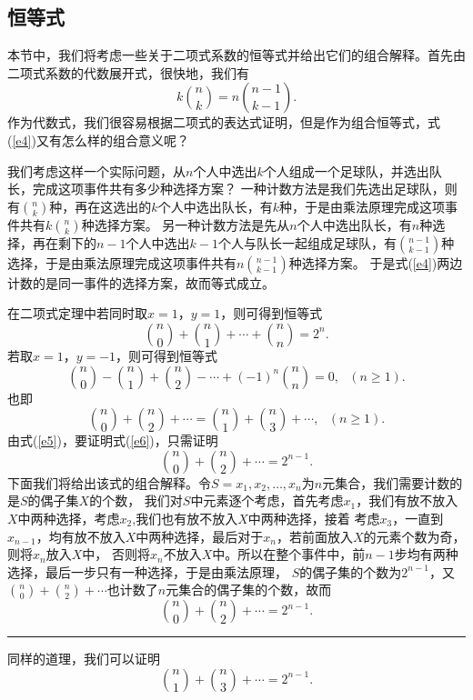 \documentclass[a4paper,11pt,twoside]{book}
\def\qed{\nopagebreak\hfill{\rule{4pt}{7pt}}\medbreak}
\begin{document}
\subsection{恒等式}
本节中，我们将考虑一些关于二项式系数的恒等式并给出它们的组合解释。首先由二项式系数的代数展开式，很快地，我们有
\begin{equation}\label{e4}
k{n\choose k}=n{n-1 \choose k-1}.
\end{equation}
作为代数式，我们很容易根据二项式的表达式证明，但是作为组合恒等式，式(\ref{e4})又有怎么样的组合意义呢？

我们考虑这样一个实际问题，从$n$个人中选出$k$个人组成一个足球队，并选出队长，完成这项事件共有多少种选择方案？
一种计数方法是我们先选出足球队，则有${n\choose
k}$种，再在这选出的$k$个人中选出队长，有$k$种，于是由乘法原理完成这项事件共有$k{n\choose
k}$种选择方案。
另一种计数方法是先从$n$个人中选出队长，有$n$种选择，再在剩下的$n-1$个人中选出$k-1$个人与队长一起组成足球队，有${n-1\choose
k-1}$种选择，于是由乘法原理完成这项事件共有$n{n-1 \choose
k-1}$种选择方案。
于是式(\ref{e4})两边计数的是同一事件的选择方案，故而等式成立。

在二项式定理中若同时取$x=1$，$y=1$，则可得到恒等式
\begin{equation}\label{e5}
{n\choose 0}+{n\choose 1}+\cdots+{n\choose n}=2^n.
\end{equation}
若取$x=1$，$y=-1$，则可得到恒等式
$${n\choose 0}-{n\choose 1}+{n\choose 2}-\cdots+(-1)^n{n\choose n}=0,\ \ \ (n\geq 1).
$$
也即
\begin{equation}\label{e6}
{n\choose 0}+{n\choose 2}+\cdots={n\choose 1}+{n\choose 3}+\cdots,\
\ \ (n\geq 1).
\end{equation}
由式(\ref{e5})，要证明式(\ref{e6})，只需证明
$${n\choose 0}+{n\choose 2}+\cdots=2^{n-1}.$$
下面我们将给出该式的组合解释。令$S={x_1,x_2,\ldots,x_n}$为$n$元集合，我们需要计数的是$S$的偶子集$X$的个数，
我们对$S$中元素逐个考虑，首先考虑$x_1$，我们有放不放入$X$中两种选择，考虑$x_2$,我们也有放不放入$X$中两种选择，接着
考虑$x_3$，一直到$x_{n-1}$，均有放不放入$X$中两种选择，最后对于$x_n$，若前面放入$X$的元素个数为奇，则将$x_n$放入$X$中，
否则将$x_n$不放入$X$中。所以在整个事件中，前$n-1$步均有两种选择，最后一步只有一种选择，于是由乘法原理，
$S$的偶子集的个数为$2^{n-1}$，又${n\choose 0}+{n\choose
2}+\cdots$也计数了$n$元集合的偶子集的个数，故而
$${n\choose 0}+{n\choose 2}+\cdots=2^{n-1}.$$
\qed

同样的道理，我们可以证明$${n\choose 1}+{n\choose
3}+\cdots=2^{n-1}.$$
\end{document}
